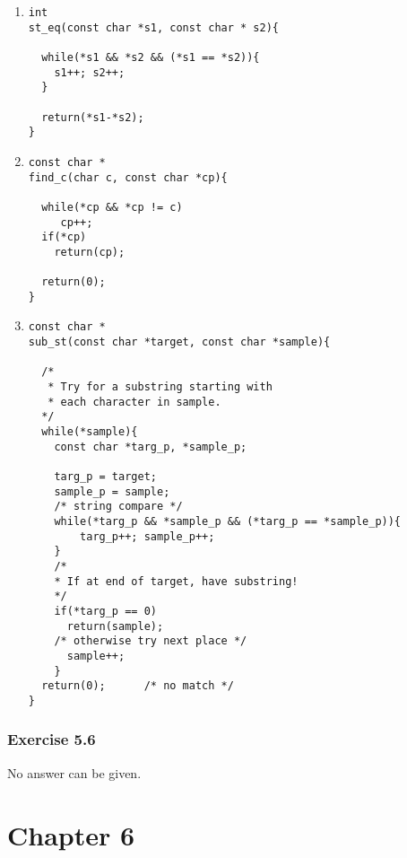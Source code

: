    \begin{enumerate}

    \item 
     \begin{Verbatim}
int
st_eq(const char *s1, const char * s2){

  while(*s1 && *s2 && (*s1 == *s2)){
    s1++; s2++;
  }

  return(*s1-*s2);
}
\end{Verbatim}

    

    \item 
     \begin{Verbatim}
const char *
find_c(char c, const char *cp){

  while(*cp && *cp != c)
     cp++;
  if(*cp)
    return(cp);

  return(0);
}
\end{Verbatim}

    

    \item 
     \begin{Verbatim}
const char *
sub_st(const char *target, const char *sample){

  /*
   * Try for a substring starting with
   * each character in sample.
  */
  while(*sample){
    const char *targ_p, *sample_p;

    targ_p = target;
    sample_p = sample;
    /* string compare */
    while(*targ_p && *sample_p && (*targ_p == *sample_p)){
        targ_p++; sample_p++;
    }
    /*
    * If at end of target, have substring!
    */
    if(*targ_p == 0)
      return(sample);
    /* otherwise try next place */
      sample++;
    }
  return(0);      /* no match */
}
\end{Verbatim}

    

   \end{enumerate}

  

  \subsubsection*{Exercise 5.6}

   No answer can be given.


  

 
        \section*{Chapter 6}
        

